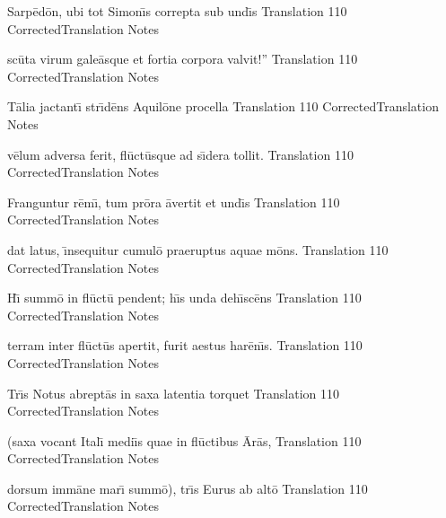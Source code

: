 \documentclass[]{article}
\begin{document}
\latline
  {Sarp\={\macron e}d\={\macron o}n, ubi tot Simon\={\macron \i}s correpta sub und\={\macron \i}s}
  { Translation }
  {110}
  { CorrectedTranslation }
  { Notes }


\newpage

\latline
  {sc\={\macron u}ta virum gale\={\macron a}sque et fortia corpora valvit!''}
  { Translation }
  {110}
  { CorrectedTranslation }
  { Notes }


\latline
  {T\={\macron a}lia jactant\={\macron \i} str\={\macron \i}d\={\macron e}ns Aquil\={\macron o}ne procella}
  { Translation }
  {110}
  { CorrectedTranslation }
  { Notes }


\latline
  {v\={\macron e}lum adversa ferit, fl\={\macron u}ct\={\macron u}sque ad s\={\macron \i}dera tollit.}
  { Translation }
  {110}
  { CorrectedTranslation }
  { Notes }


\newpage

\latline
  {Franguntur r\={\macron e}m\={\macron \i}, tum pr\={\macron o}ra \={\macron a}vertit et und\={\macron \i}s}
  { Translation }
  {110}
  { CorrectedTranslation }
  { Notes }


\latline
  {dat latus, \={\macron \i}nsequitur cumul\={\macron o} praeruptus aquae m\={\macron o}ns.}
  { Translation }
  {110}
  { CorrectedTranslation }
  { Notes }


\latline
  {H\={\macron \i} summ\={\macron o} in fl\={\macron u}ct\={\macron u} pendent; h\={\macron \i}s unda deh\={\macron \i}sc\={\macron e}ns}
  { Translation }
  {110}
  { CorrectedTranslation }
  { Notes }


\newpage

\latline
  {terram inter fl\={\macron u}ct\={\macron u}s apertit, furit aestus har\={\macron e}n\={\macron \i}s.}
  { Translation }
  {110}
  { CorrectedTranslation }
  { Notes }


\latline
  {Tr\={\macron \i}s Notus abrept\={\macron a}s in saxa latentia torquet}
  { Translation }
  {110}
  { CorrectedTranslation }
  { Notes }


\latline
  {(saxa vocant Ital\={\macron \i} medi\={\macron \i}s quae in fl\={\macron u}ctibus \={\macron A}r\={\macron a}s,}
  { Translation }
  {110}
  { CorrectedTranslation }
  { Notes }


\newpage

\latline
  {dorsum imm\={\macron a}ne mar\={\macron \i} summ\={\macron o}), tr\={\macron \i}s Eurus ab alt\={\macron o}}
  { Translation }
  {110}
  { CorrectedTranslation }
  { Notes }
\end{document}
